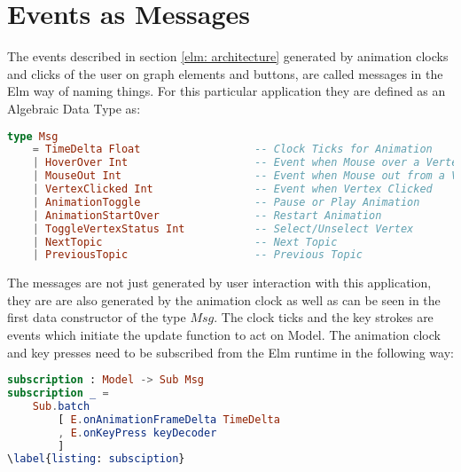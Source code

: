 \section{Events as Messages}
\label{impl: messages}
The events described in section \autoref{elm: architecture} generated by
animation clocks and clicks of the user on graph elements and buttons, are
called messages in the Elm way of naming things. For this particular
application they are defined as an Algebraic Data Type as:

\begin{lstlisting}[language=elm
                  , caption={
                              Abstract Data Type Msg with it's Data Constructors.
                              These messages are emanated from buttons, graph vertices
                              system clocks and are received by the update function
                              to change the $Model$, which carries the state of the
                              program.
                  }
                  ]
type Msg
    = TimeDelta Float                  -- Clock Ticks for Animation
    | HoverOver Int                    -- Event when Mouse over a Vertex                              
    | MouseOut Int                     -- Event when Mouse out from a Vertex                               
    | VertexClicked Int                -- Event when Vertex Clicked                              
    | AnimationToggle                  -- Pause or Play Animation
    | AnimationStartOver               -- Restart Animation
    | ToggleVertexStatus Int           -- Select/Unselect Vertex
    | NextTopic                        -- Next Topic
    | PreviousTopic                    -- Previous Topic
\end{lstlisting}
The messages are not just generated by user interaction with this application,
they are are also generated by the animation clock as well as can be seen in
the first data constructor of the type $Msg$.  The clock ticks and the key
strokes are events which initiate the update function to act on Model.  The
animation clock and key presses need to be subscribed from the Elm runtime in
the following way:

\begin{lstlisting}[language=elm
                  , caption={
                            Subscription of Animation clock and Key presses services.
                            Subscriptions are used to catch the events which are
                            emanated outside the DOM. In this code, a system clock
                            and key presses are subscribed to by the program.
                            }
                  ]
subscription : Model -> Sub Msg
subscription _ =
    Sub.batch
        [ E.onAnimationFrameDelta TimeDelta
        , E.onKeyPress keyDecoder
        ]
\label{listing: subsciption}
\end{lstlisting}

